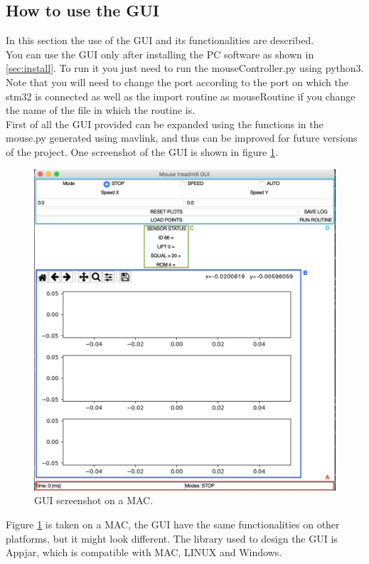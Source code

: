 \documentclass[12pt,a4paper, twoside]{article}
\begin{document}
\subsection{How to use the GUI} \label{sec:gui}  
In this section the use of the GUI and its functionalities are described.\\

You can use the GUI only after installing the PC software as shown in \ref{sec:install}. To run it you just need to run the mouseController.py using python3. Note that you will need to change the port according to the port on which the stm32 is connected as well as the import routine as mouseRoutine if you change the name of the file in which the routine is. \\

First of all the GUI provided can be expanded using the functions in the mouse.py generated using mavlink, and thus can be improved for future versions of the project. One screenshot of the GUI is shown in figure \ref{fig:GUI}.
\begin{figure}[htp]
	\centering
	\includegraphics[width=1\linewidth]{fig/GUI.png}
	\caption{GUI screenshot on a MAC.}\label{fig:GUI}
\end{figure}
Figure \ref{fig:GUI} is taken on a MAC, the GUI have the same functionalities on other platforms, but it might look different. The library used to design the GUI is Appjar, which is compatible with MAC, LINUX and Windows.
\end{document}
